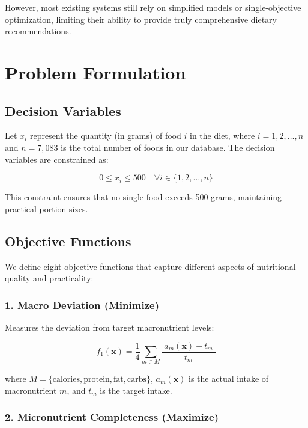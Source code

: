 \documentclass[12pt,a4paper]{article}
\begin{document}
However, most existing systems still rely on simplified models or single-objective optimization, limiting their ability to provide truly comprehensive dietary recommendations.

\section{Problem Formulation}

\subsection{Decision Variables}

Let $x_i$ represent the quantity (in grams) of food $i$ in the diet, where $i = 1, 2, \ldots, n$ and $n = 7,083$ is the total number of foods in our database. The decision variables are constrained as:

\begin{equation}
0 \leq x_i \leq 500 \quad \forall i \in \{1, 2, \ldots, n\}
\end{equation}

This constraint ensures that no single food exceeds 500 grams, maintaining practical portion sizes.

\subsection{Objective Functions}

We define eight objective functions that capture different aspects of nutritional quality and practicality:

\subsubsection{1. Macro Deviation (Minimize)}

Measures the deviation from target macronutrient levels:

\begin{equation}
f_1(\mathbf{x}) = \frac{1}{4} \sum_{m \in M} \frac{|a_m(\mathbf{x}) - t_m|}{t_m}
\end{equation}

where $M = \{\text{calories}, \text{protein}, \text{fat}, \text{carbs}\}$, $a_m(\mathbf{x})$ is the actual intake of macronutrient $m$, and $t_m$ is the target intake.

\subsubsection{2. Micronutrient Completeness (Maximize)}
\end{document}
